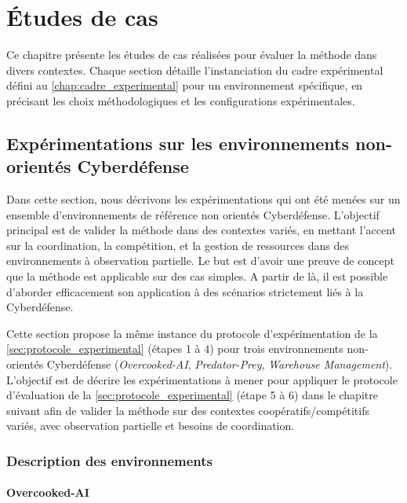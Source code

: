\clearpage
\thispagestyle{empty}
\null
\newpage


\chapter{Études de cas}
\label{chap:case_studies}

Ce chapitre présente les études de cas réalisées pour évaluer la méthode  dans divers contextes. Chaque section détaille l'instanciation du cadre expérimental défini au \autoref{chap:cadre_experimental} pour un environnement spécifique, en précisant les choix méthodologiques et les configurations expérimentales.

\section{Expérimentations sur les environnements non-orientés Cyberdéfense}

Dans cette section, nous décrivons les expérimentations qui ont été menées sur un ensemble d'environnements de référence non orientés Cyberdéfense. L'objectif principal est de valider la méthode  dans des contextes variés, en mettant l'accent sur la coordination, la compétition, et la gestion de ressources dans des environnements à observation partielle. Le but est d'avoir une preuve de concept que la méthode  est applicable sur des cas simples. A partir de là, il est possible d'aborder efficacement son application à des scénarios strictement liés à la Cyberdéfense.

Cette section propose la même instance du protocole d'expérimentation de la \autoref{sec:protocole_experimental} (étapes 1 à 4) pour trois environnements non-orientés Cyberdéfense (\textit{Overcooked-AI}, \textit{Predator-Prey}, \textit{Warehouse Management}).
L'objectif est de décrire les expérimentations à mener pour appliquer le protocole d'évaluation de la \autoref{sec:protocole_experimental} (étape 5 à 6) dans le chapitre suivant afin de valider la méthode  sur des contextes coopératifs/compétitifs variés, avec observation partielle et besoins de coordination.


\subsection{Description des environnements}

\subsubsection*{Overcooked-AI}

